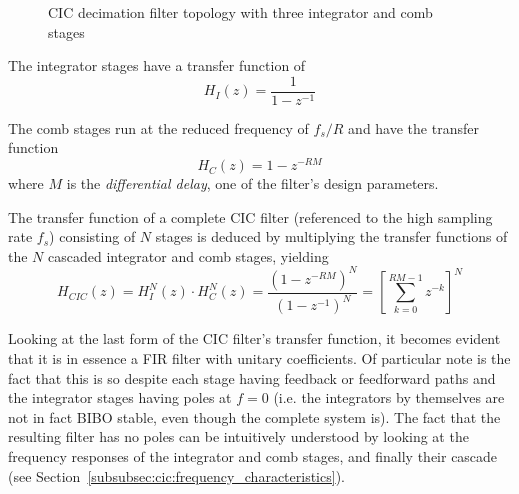 \begin{figure}
    \centering
    
    \caption[CIC Filter Topology]
        {CIC decimation filter topology with three integrator and comb stages}
    \label{fig:filtertopologies:cic}
\end{figure}

The integrator stages have a transfer function of
\begin{equation}
    \label{eq:cic:integrator_stage}
    H_I(z) = \frac{1}{1-z^{-1}}
\end{equation}

The comb stages run at the reduced frequency of $f_s/R$ and have the transfer
function
\begin{equation}
    \label{eq:cic:comb_stage}
    H_C(z) = 1 - z^{-RM}
\end{equation}
where  $M$  is the  \emph{differential  delay},  one  of the  filter's  design
parameters.

The  transfer function  of  a  complete CIC  filter  (referenced  to the  high
sampling rate  $f_s$) consisting of $N$  stages is deduced by  multiplying the
transfer functions of the $N$ cascaded integrator and comb stages, yielding
\begin{equation}
    \label{eq:cic:complete}
    H_{CIC}(z) = H_I^N(z) \cdot H_C^N(z) = 
    \frac{\left(1 - z^{-RM}\right)^N}{\left( 1 - z^{-1} \right)^N} =
    \left[\sum_{k = 0}^{RM-1} z^{-k}\right]^N
\end{equation}

Looking at  the last form  of the CIC  filter's transfer function,  it becomes
evident  that it  is in  essence a  FIR filter  with unitary  coefficients. Of
particular note is the fact that this is so despite each stage having feedback
or feedforward paths and  the integrator stages having poles at  $f = 0$ (i.e.
the integrators  by themselves are  not in fact  BIBO stable, even  though the
complete  system  is). The  fact  that  the  resulting  filter  has  no  poles
can  be  intuitively   understood  by  looking  at   the  frequency  responses
of  the   integrator  and  comb   stages,  and  finally  their   cascade  (see
Section~\ref{subsubsec:cic:frequency_characteristics}).

